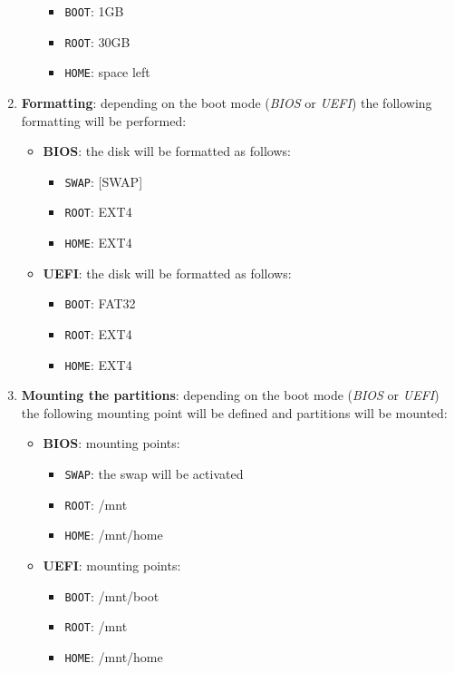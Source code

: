 \documentclass{article}
\begin{document}
\begin{enumerate}
\begin{itemize}
		\begin{itemize}
			\item \texttt{BOOT}: 1GB
			\item \texttt{ROOT}: 30GB
			\item \texttt{HOME}: space left
		\end{itemize}
	\end{itemize}
	\item \textbf{Formatting}: depending on the boot mode (\textit{BIOS} or \textit{UEFI}) the following formatting will be performed:
	\begin{itemize}
		\item \textbf{BIOS}: the disk will be formatted as follows:
		\begin{itemize}
			\item \texttt{SWAP}: [SWAP]
			\item \texttt{ROOT}: EXT4
			\item \texttt{HOME}: EXT4
		\end{itemize}
		\item \textbf{UEFI}: the disk will be formatted as follows:
		\begin{itemize}
			\item \texttt{BOOT}: FAT32
			\item \texttt{ROOT}: EXT4
			\item \texttt{HOME}: EXT4
		\end{itemize}
	\end{itemize}
	\item \textbf{Mounting the partitions}: depending on the boot mode (\textit{BIOS} or \textit{UEFI}) the following mounting point will be defined and partitions will be mounted:
	\begin{itemize}
		\item \textbf{BIOS}: mounting points:
		\begin{itemize}
			\item \texttt{SWAP}: the swap will be activated
			\item \texttt{ROOT}: /mnt
			\item \texttt{HOME}: /mnt/home
		\end{itemize}
		\item \textbf{UEFI}: mounting points:
		\begin{itemize}
			\item \texttt{BOOT}: /mnt/boot
			\item \texttt{ROOT}: /mnt
			\item \texttt{HOME}: /mnt/home
		\end{itemize}

\end{itemize}
\end{enumerate}
\end{document}
